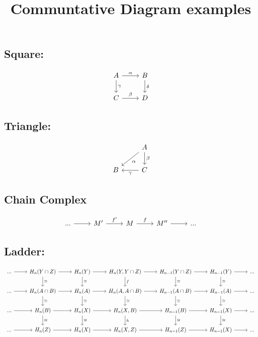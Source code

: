 \documentclass{article}
\title{Communtative Diagram examples}
\begin{document}
	
	\maketitle
	
\subsection*{Square:}
\begin{equation*}
\begin{tikzcd}
A \arrow[r,"\alpha"] \arrow[d,"\gamma"] & B \arrow[d,"\delta"] \\
C \arrow[r,"\beta"] & D
\end{tikzcd}
\end{equation*}

\subsection*{Triangle:}
\begin{equation*}
\begin{tikzcd}
 & A \arrow[ld, "\alpha"] \arrow[d,"\beta"] \\
 B  & C \arrow[l,"\gamma"]
\end{tikzcd}
\end{equation*}

\subsection*{Chain Complex}
\begin{equation*}
\begin{tikzcd}
... \arrow[r] & M' \arrow[r,"f'"] & M \arrow[r,"f"] & M'' \arrow[r] & ...
\end{tikzcd}
\end{equation*}

\subsection*{Ladder:}
\begin{equation*}
\begin{tikzcd}
...  \arrow[r] & H_n(Y\cap Z)  \arrow[r] \arrow[d,"\cong"] & H_n(Y) \arrow[r] \arrow[d,"\cong"] & H_n(Y,Y\cap Z) \arrow[r] \arrow[d,"f"] & H_{n-1}(Y \cap Z) \arrow[r] \arrow[d,"\cong"] & H_{n-1}(Y) \arrow[r] \arrow [d,"\cong"] & ...\\	
...  \arrow[r] & H_n(A\cap B)  \arrow[r] \arrow[d,"\cong"] & H_n(A) \arrow[r] \arrow[d,"\cong"] & H_n(A,A\cap B) \arrow[r] \arrow[d,"\cong"] &
H_{n-1}(A\cap B) \arrow[r] \arrow[d,"\cong"] & H_{n-1}(A) \arrow[r] \arrow [d,"\cong"] & ...\\	
...  \arrow[r] & H_n(B)  \arrow[r] \arrow[d,"\cong"] & H_n(X) \arrow[r] \arrow[d,"\cong"] & H_n(X,B) \arrow[r] \arrow[d,"h"] & H_{n-1}(B) \arrow[r] \arrow[d,"\cong"] & H_{n-1}(X) \arrow[r] \arrow [d,"\cong"] & ...\\
...  \arrow[r] & H_n(Z)  \arrow[r] & H_n(X) \arrow[r] & H_n(X,Z) \arrow[r] & H_{n-1}(Z) \arrow[r] & H_{n-1}(X) \arrow[r] & ...
\end{tikzcd}
\end{equation*}
\end{document}
